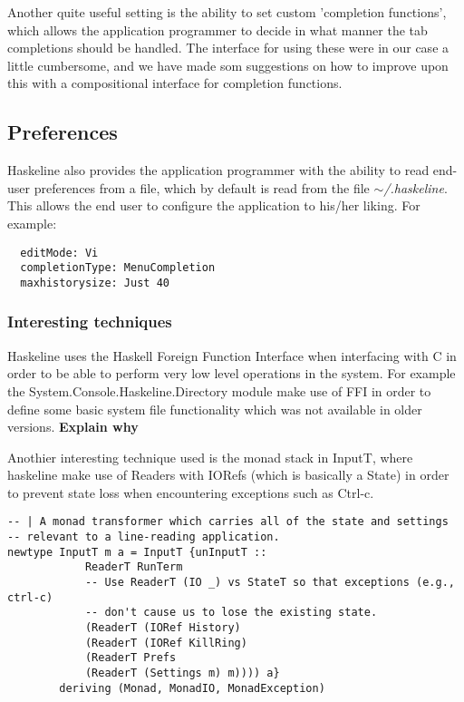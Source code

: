 \documentclass[11pt,a4paper]{article}
\begin{document}
Another quite useful setting is the ability to set custom 'completion
functions', which allows the application programmer to decide in what manner the
tab completions should be handled. The interface for using these were in our
case a little cumbersome, and we have made som suggestions on how to improve
upon this with a compositional interface for completion functions.

\subsection{Preferences}
Haskeline also provides the application programmer with the ability to read
end-user preferences from a file, which by default is read from the file
$\mathtt{\sim}$\textit{/.haskeline}. This allows the end user to configure the
application to his/her liking. For example:

\begin{verbatim}
  editMode: Vi
  completionType: MenuCompletion
  maxhistorysize: Just 40
\end{verbatim}

\subsubsection{Interesting techniques}
Haskeline uses the Haskell Foreign Function Interface when interfacing with C in
order to be able to perform very low level operations in the system. For example
the System.Console.Haskeline.Directory module make use of FFI in order to define
some basic system file functionality which was not available in older versions.
\textbf{Explain why}

Anothier interesting technique used is the monad stack in InputT, where
haskeline make use of Readers with IORefs (which is basically a State) in order
to prevent state loss when encountering exceptions such as Ctrl-c.

\begin{verbatim}
-- | A monad transformer which carries all of the state and settings
-- relevant to a line-reading application.
newtype InputT m a = InputT {unInputT ::
            ReaderT RunTerm
            -- Use ReaderT (IO _) vs StateT so that exceptions (e.g., ctrl-c)
            -- don't cause us to lose the existing state.
            (ReaderT (IORef History)
            (ReaderT (IORef KillRing)
            (ReaderT Prefs
            (ReaderT (Settings m) m)))) a}
        deriving (Monad, MonadIO, MonadException)
\end{verbatim}
\end{document}
